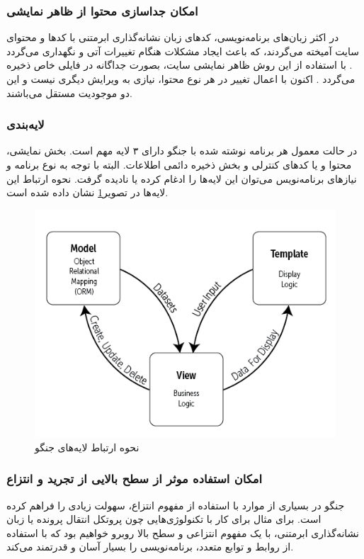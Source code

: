 {\subsubsection{امکان جداسازی محتوا از ظاهر نمایشی}
در اکثر زبان‌های برنامه‌نویسی، کدهای زبان نشانه‌گذاری ابرمتنی با کدها و محتوای سایت آمیخته می‌گردند، که باعث ایجاد مشکلات هنگام تغییرات آتی و نگهداری می‌گردد . با استفاده از این روش ظاهر نمایشی سایت، بصورت جداگانه در فایلی خاص ذخیره می‌گردد . اکنون با اعمال تغییر در هر نوع محتوا، نیازی به ویرایش دیگری نیست و این دو موجودیت مستقل می‌باشند.

\subsubsection{لایه‌بندی}
در حالت معمول هر برنامه نوشته شده با جنگو دارای ۳ لایه مهم است. بخش نمایشی، محتوا و یا کدهای کنترلی و بخش ذخیره دائمی اطلاعات. البته با توجه به نوع برنامه و نیاز‌های برنامه‌نویس می‌توان این لایه‌ها را ادغام کرده یا نادیده گرفت. نحوه ارتباط این لایه‌ها در تصویر\ref{mtv} نشان داده شده است.
 
\begin{figure}[t!]
    \centering
    \includegraphics[scale=0.75]{figures/mtv.png}
    \caption{نحوه ارتباط لایه‌های جنگو}
    \label{mtv}
\end{figure}


\subsubsection{امکان استفاده موثر از سطح بالایی از تجرید و انتزاع}
جنگو در بسیاری از موارد با استفاده از مفهوم انتزاع، سهولت زیادی را فراهم کرده است. برای مثال برای کار با تکنولوژی‌هایی چون پروتکل انتقال پرونده یا زبان نشانه‌گذاری ابرمتنی، با یک مفهوم انتزاعی و سطح بالا روبرو خواهیم بود که با استفاده از روابط و توابع متعدد، برنامه‌نویسی را بسیار آسان و قدرتمند می‌کند.
 
}
